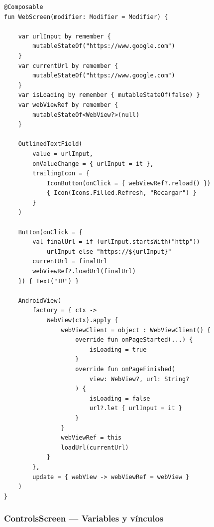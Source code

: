 \documentclass[stu, 12pt, letterpaper, donotrepeattitle, floatsintext, natbib]{apa7}
\begin{document}
\begin{lstlisting}[caption={Variables y vínculos en WebScreen.kt}]
@Composable
fun WebScreen(modifier: Modifier = Modifier) {

    var urlInput by remember {
        mutableStateOf("https://www.google.com")
    }
    var currentUrl by remember {
        mutableStateOf("https://www.google.com")
    }
    var isLoading by remember { mutableStateOf(false) }
    var webViewRef by remember {
        mutableStateOf<WebView?>(null)
    }

    OutlinedTextField(
        value = urlInput,
        onValueChange = { urlInput = it },
        trailingIcon = {
            IconButton(onClick = { webViewRef?.reload() })
            { Icon(Icons.Filled.Refresh, "Recargar") }
        }
    )

    Button(onClick = {
        val finalUrl = if (urlInput.startsWith("http"))
            urlInput else "https://${urlInput}"
        currentUrl = finalUrl
        webViewRef?.loadUrl(finalUrl)
    }) { Text("IR") }

    AndroidView(
        factory = { ctx ->
            WebView(ctx).apply {
                webViewClient = object : WebViewClient() {
                    override fun onPageStarted(...) {
                        isLoading = true
                    }
                    override fun onPageFinished(
                        view: WebView?, url: String?
                    ) {
                        isLoading = false
                        url?.let { urlInput = it }
                    }
                }
                webViewRef = this
                loadUrl(currentUrl)
            }
        },
        update = { webView -> webViewRef = webView }
    )
}
\end{lstlisting}

\subsubsection{ControlsScreen --- Variables y vínculos}
\end{document}
